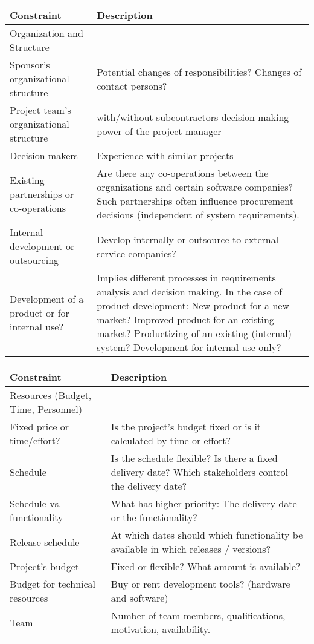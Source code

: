 %
%
\begin{center}
    \begin{tabular}{| p{6cm} | p{6cm}  |}
		\hline
		\textbf {Constraint} & \textbf {Description} \\ \hline
		Organization and Structure \\ \hline
		Sponsor’s organizational structure & Potential changes of responsibilities? Changes of contact persons? \\ \hline
		Project team’s organizational structure & with/without subcontractors decision-making power of the project manager \\ \hline
		Decision makers & Experience with similar projects \\ \hline
		Existing partnerships or co-operations & Are there any co-operations between the organizations and certain software companies? Such partnerships often influence procurement decisions (independent of system requirements).\\ \hline
		Internal development or outsourcing & Develop internally or outsource to external service companies? \\ \hline
		Development of a product or for internal use? & Implies different processes in requirements analysis and decision making. In the case of product development: New product for a new market? Improved product for an existing market? Productizing of an existing (internal) system? Development for internal use only? \\ \hline
    \end{tabular}
\end{center}
\begin{center}
    \begin{tabular}{| p{6cm} | p{6cm}  |}
		\hline
		\textbf {Constraint} & \textbf {Description} \\ \hline
		Resources (Budget, Time, Personnel) \\ \hline
		Fixed price or time/effort? & Is the project’s budget fixed or is it calculated by time or effort? \\ \hline
		Schedule & Is the schedule flexible? Is there a fixed delivery date? Which stakeholders control the delivery date? \\ \hline
		Schedule vs. functionality & What has higher priority: The delivery date or the functionality? \\ \hline
		Release-schedule & At which dates should which functionality be available in which releases / versions? \\ \hline
		Project’s budget & Fixed or flexible? What amount is available? \\ \hline
		Budget for technical resources & Buy or rent development tools? (hardware and software) \\ \hline
		Team & Number of team members, qualifications, motivation, availability. \\ \hline
    \end{tabular}
\end{center}
